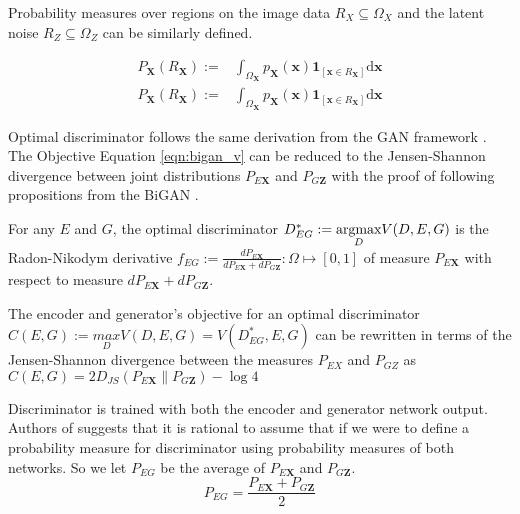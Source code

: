 Probability measures over regions on the image data $R_X \subseteq \Omega_{X}$ and the latent noise
$R_Z \subseteq \Omega_{Z}$ can be similarly defined.

\begin{align}
    P_{\mathbf{X}}\left(R_{\mathbf{X}}\right) :=&\int_{\Omega_{\mathbf{X}}} p_{\mathbf{X}}(\mathbf{x}) \mathbf{1}_{\left[\mathbf{x} \in R_{\mathbf{X}}\right]} \mathrm{d} \mathbf{x} \\[5pt]
    P_{\mathbf{X}}\left(R_{\mathbf{X}}\right) :=&\int_{\Omega_{\mathbf{X}}} p_{\mathbf{X}}(\mathbf{x}) \mathbf{1}_{\left[\mathbf{x} \in R_{\mathbf{X}}\right]} \mathrm{d} \mathbf{x}
\end{align}

Optimal discriminator follows the same derivation from the GAN framework
\cite{Goodfellow:2014:GAN:2969033.2969125}. The Objective Equation \ref{eqn:bigan_v} can be reduced
to the Jensen-Shannon divergence between joint distributions $P_{E\mathbf{X}}$ and $P_{G\mathbf{Z}}$
with the proof of following propositions from the BiGAN \cite{Donahue2017AdversarialFL}.

\begin{prop}
    \label{prop:bigan_1}
    For any $E$ and $G$, the optimal discriminator $D^*_{EG} := \\ \underset{D}{\text{argmax}}  V(D, E,
    G)$ is the Radon-Nikodym derivative $f_{EG} := \frac{dP_{E\mathbf{X}}}{dP_{E\mathbf{X}} +
    dP_{G\mathbf{Z}}}  : \Omega  \mapsto [0, 1]$ of measure $P_{E\mathbf{X}}$ with respect to measure
    $ dP_{E\mathbf{X}} + dP_{G\mathbf{Z}}$.
\end{prop}

\begin{prop}
    \label{prop:bigan_2}
  The encoder and generator's objective for an optimal discriminator $C(E, G):= \underset{D}{max}
  V(D, E, G) = V(D^*_{EG}, E, G)$ can be rewritten in terms of the Jensen-Shannon divergence between
  the measures $P_{EX}$ and $P_{GZ}$ as $C(E, G) = 2 D_{JS} (P_{E\mathbf{X}} \parallel P_{G\mathbf{Z}}) -
  \log 4$    
\end{prop}

Discriminator is trained with both the encoder and generator network output. Authors of \cite{Donahue2017AdversarialFL}
suggests that it is rational to assume that if we were to define a probability measure for discriminator using 
probability measures of both networks. So we let $P_{EG}$
be the average of $P_{E\mathbf{X}}$ and $P_{G\mathbf{Z}}$. 
\begin{equation}
  P_{EG} = \frac{P_{E\mathbf{X}} + P_{G\mathbf{Z}}}{2}  
\end{equation}

